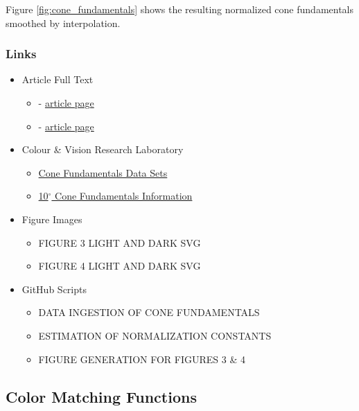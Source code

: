 \documentclass{article}
\begin{document}
\begin{multicols}{2}
Figure \ref{fig:cone_fundamentals} shows the resulting normalized cone fundamentals smoothed by interpolation.

\subsubsection{Links} %

\begin{itemize}
    \item Article Full Text
    \begin{itemize}
        \item \cite{stockman1999spectral} - \href{https://www.sciencedirect.com/science/article/pii/S0042698998002259}{article page}
        \item \cite{stockman2000spectral} - \href{https://www.sciencedirect.com/science/article/pii/S0042698900000213}{article page}
    \end{itemize}
    \item Colour \& Vision Research Laboratory
    \begin{itemize}
        \item \href{http://www.cvrl.org/cones.htm}{Cone Fundamentals Data Sets}
        \item \href{http://www.cvrl.org/database/text/cones/ss10.htm}{10$^\circ$ Cone Fundamentals Information}
    \end{itemize}
    \item Figure Images
    \begin{itemize}
        \item FIGURE 3 LIGHT AND DARK SVG
        \item FIGURE 4 LIGHT AND DARK SVG
    \end{itemize}
    \item GitHub Scripts
    \begin{itemize}
        \item DATA INGESTION OF CONE FUNDAMENTALS
        \item ESTIMATION OF NORMALIZATION CONSTANTS
        \item FIGURE GENERATION FOR FIGURES 3 \& 4
    \end{itemize}
\end{itemize}

\subsection{Color Matching Functions} %


\end{multicols}
\end{document}
